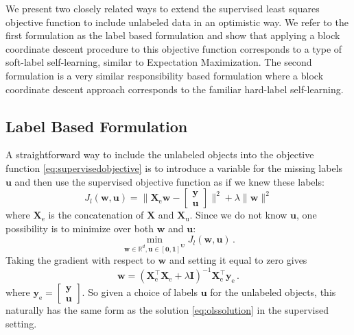 \documentclass[conference,a4paper,10pt]{IEEEtran}\usepackage[]{graphicx}\usepackage[]{color}
\newcommand{\Xe}{\mathbf{X}_\textrm{e}}
\begin{document}
We present two closely related ways to extend the supervised least squares objective function to include unlabeled data in an optimistic way. We refer to the first formulation as the label based formulation and show that applying a block coordinate descent procedure to this objective function corresponds to a type of soft-label self-learning, similar to Expectation Maximization. The second formulation is a very similar responsibility based formulation where a block coordinate descent approach corresponds to the familiar hard-label self-learning.

\subsection{Label Based Formulation}
A straightforward way to include the unlabeled objects into the objective function \eqref{eq:supervisedobjective} is to introduce a variable for the missing labels $\mathbf{u}$ and then use the supervised objective function as if we knew these labels:
$$
J_l(\mathbf{w},\mathbf{u}) = \| \Xe \mathbf{w}-\begin{bmatrix} \mathbf{y} \\ \mathbf{u} \end{bmatrix} \|^2 + \lambda \|\mathbf{w} \|^2
$$
where $\Xe$ is the concatenation of $\mathbf{X}$ and $\mathbf{X}_\text{u}$. Since we do not know $\mathbf{u}$, one possibility is to minimize over both $\mathbf{w}$ and $\mathbf{u}$:
$$
\min_{\mathbf{w}\in \mathbb{R}^d,\mathbf{\mathbf{u} \in [0,1]^U}} J_l(\mathbf{w},\mathbf{u}) \,.
$$
Taking the gradient with respect to $\mathbf{w}$ and setting it equal to zero gives
$$
\mathbf{w} = \left( \mathbf{X}_\text{e}^\top \mathbf{X}_\text{e}  + \lambda \mathbf{I} \right)^{-1} \mathbf{X}_\text{e}^\top \mathbf{y}_\text{e} \,.
$$
where $\mathbf{y}_\text{e}=\begin{bmatrix} \mathbf{y} \\ \mathbf{u} \end{bmatrix}$. So given a choice of labels $\mathbf{u}$ for the unlabeled objects, this naturally has the same form as the solution \eqref{eq:olssolution} in the supervised setting.
\end{document}
